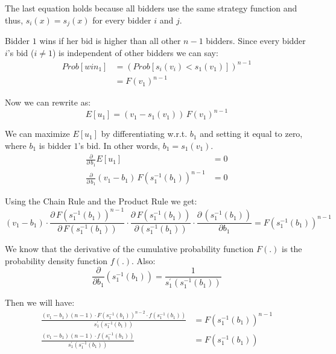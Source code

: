 The last equation holds because all bidders use the same strategy function and thus, $s_i(x) = s_j(x)$ for every bidder $i$ and $j$.

Bidder $1$ wins if her bid is higher than all other $n-1$ bidders. Since every bidder $i$'s bid ($i \neq 1$) is independent of other bidders we can say:
\begin{align*}
Prob\left[win_1\right] &= \left(Prob\left[s_i(v_i) < s_1(v_1)\right]\right)^{n-1}\\
&= F(v_1)^{n-1}
\end{align*}

Now we can rewrite  as:
\begin{equation}
\label{eq:utility2}
E[u_1] = \left(v_1 - s_1\left(v_1\right)\right)\,F(v_1)^{n-1}
\end{equation}

We can maximize $E[u_1]$ by differentiating  w.r.t. $b_1$ and setting it equal to zero, where $b_1$ is bidder $1$'s bid. In other words, $b_1 = s_1(v_1)$.
\begin{align*}
\frac{\partial}{\partial\,b_1}E[u_1] &= 0\\
\frac{\partial}{\partial\,b_1}\left(v_1 - b_1\right)\,F\left(s_1^{-1}\left(b_1\right)\right)^{n-1} &= 0
\end{align*}

Using the Chain Rule and the Product Rule we get:
\begin{equation*}
\left(v_1 - b_1\right)\cdot\frac{\partial\, F\left(s_1^{-1}\left(b_1\right)\right)^{n-1}}{\partial\,F\left(s_1^{-1}\left(b_1\right)\right)}\cdot\frac{\partial\,F\left(s_1^{-1}\left(b_1\right)\right)}{\partial\left(s_1^{-1}\left(b_1\right)\right)}\cdot\frac{\partial\,\left(s_1^{-1}\left(b_1\right)\right)}{\partial b_1} = F\left(s_1^{-1}\left(b_1\right)\right)^{n-1}
\end{equation*}

We know that the derivative of the cumulative probability function $F(.)$ is the probability density function $f(.)$. Also:
\begin{equation*}
\frac{\partial}{\partial b_1}\left(s_1^{-1}\left(b_1\right)\right) = \frac{1}{s_1^\prime\left(s_1^{-1}\left(b_1\right)\right)}
\end{equation*}

Then we will have:
\begin{align}
\frac{\left(v_1 - b_1\right)\left(n-1\right)\cdot F\left(s_1^{-1}\left(b_1\right)\right)^{n-2}\cdot f\left(s_1^{-1}\left(b_1\right)\right)}{s_1^\prime\left(s_1^{-1}\left(b_1\right)\right)} &= F\left(s_1^{-1}\left(b_1\right)\right)^{n-1}\\
\frac{\left(v_1 - b_1\right)\left(n-1\right)\cdot f\left(s_1^{-1}\left(b_1\right)\right)}{s_1^\prime\left(s_1^{-1}\left(b_1\right)\right)} &= F\left(s_1^{-1}\left(b_1\right)\right)\label{eq:deriv1}
\end{align}

